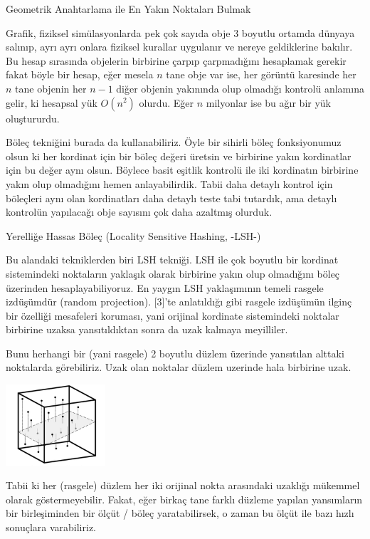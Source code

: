 \documentclass[12pt,fleqn]{article}\usepackage{../../common}
\begin{document}
Geometrik Anahtarlama ile En Yakın Noktaları Bulmak

Grafik, fiziksel simülasyonlarda pek çok sayıda obje 3 boyutlu ortamda dünyaya
salınıp, ayrı ayrı onlara fiziksel kurallar uygulanır ve nereye geldiklerine
bakılır. Bu hesap sırasında objelerin birbirine çarpıp çarpmadığını hesaplamak
gerekir fakat böyle bir hesap, eğer mesela $n$ tane obje var ise, her görüntü
karesinde her $n$ tane objenin her $n-1$ diğer objenin yakınında olup olmadığı
kontrolü anlamına gelir, ki hesapsal yük $O(n^2)$ olurdu. Eğer $n$ milyonlar ise
bu ağır bir yük oluştururdu.

Böleç tekniğini burada da kullanabiliriz. Öyle bir sihirli böleç fonksiyonumuz
olsun ki her kordinat için bir böleç değeri üretsin ve birbirine yakın
kordinatlar için bu değer aynı olsun. Böylece basit eşitlik kontrolü ile iki
kordinatın birbirine yakın olup olmadığını hemen anlayabilirdik. Tabii daha
detaylı kontrol için böleçleri aynı olan kordinatları daha detaylı teste tabi
tutardık, ama detaylı kontrolün yapılacağı obje sayısını çok daha azaltmış
olurduk.

Yerelliğe Hassas Böleç (Locality Sensitive Hashing, -LSH-)

Bu alandaki tekniklerden biri LSH tekniği. LSH ile çok boyutlu bir kordinat
sistemindeki noktaların yaklaşık olarak birbirine yakın olup olmadığını böleç
üzerinden hesaplayabiliyoruz. En yaygın LSH yaklaşımının temeli rasgele
izdüşümdür (random projection). [3]'te anlatıldığı gibi rasgele izdüşümün ilginç
bir özelliği mesafeleri koruması, yani orijinal kordinate sistemindeki noktalar
birbirine uzaksa yansıtıldıktan sonra da uzak kalmaya meyilliler.

Bunu herhangi bir (yani rasgele) 2 boyutlu düzlem üzerinde yansıtılan alttaki
noktalarda görebiliriz. Uzak olan noktalar düzlem uzerinde hala birbirine uzak.

\includegraphics[width=10em]{algs_073_hash_01.png}

Tabii ki her (rasgele) düzlem her iki orijinal nokta arasındaki uzaklığı
mükemmel olarak göstermeyebilir. Fakat, eğer birkaç tane farklı düzleme yapılan
yansımların bir birleşiminden bir ölçüt / böleç yaratabilirsek, o zaman bu ölçüt
ile bazı hızlı sonuçlara varabiliriz.
\end{document}
